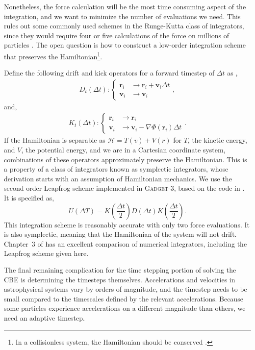 Nonetheless, the force calculation will be the most time consuming aspect of the integration, and we want to minimize the number of evaluations we need. This rules out some commonly used schemes in the Runge-Kutta class of integrators, since they would require four or five calculations of the force on millions of particles \citep{numerical_recipes_fortran}. The open question is how to construct a low-order integration scheme that preserves the Hamiltonian\footnote{In a collisionless system, the Hamiltonian should be conserved \citep{BT}.}.

Define the following drift and kick operators for a forward timestep of $\Delta t$ as \citep{quinn_1997},
\begin{eqnarray}
D_t(\Delta t) : \begin{cases} 
	  \textbf{r}_i & \longrightarrow  \textbf{r}_i + \textbf{v}_i \Delta t\\
      \textbf{v}_i & \longrightarrow  \textbf{v}_i 
   \end{cases},
\end{eqnarray}
and,
\begin{eqnarray}
K_t(\Delta t) : \begin{cases} 
	  \textbf{r}_i & \longrightarrow  \textbf{r}_i\\
      \textbf{v}_i & \longrightarrow  \textbf{v}_i  - \nabla \Phi(\textbf{r}_i) \Delta t
   \end{cases}.
\end{eqnarray}
If the Hamiltonian is separable as $\mathcal{H} = T(v) + V(r)$ for $T$, the kinetic energy, and  $V$, the potential energy, and we are in a Cartesian coordinate system, combinations of these operators approximately preserve the Hamiltonian. This is a property of a class of integrators known as symplectic integrators, whose derivation starts with an assumption of Hamiltonian mechanics. We use the second order Leapfrog scheme implemented in \textsc{Gadget-3}, based on the code in \citet{GadgetCodePaper}. It is specified as,
\begin{equation}
U(\Delta T) = K\left(\frac{\Delta t}{2}\right) D\left(\Delta t\right) K\left(\frac{\Delta t}{2}\right).
\end{equation}
This integration scheme is reasonably accurate with only two force evaluations. It is also symplectic, meaning that the Hamiltonian of the system will not drift. Chapter~3 of \citet{BT} has an excellent comparison of numerical integrators, including the Leapfrog scheme given here.

The final remaining complication for the time stepping portion of solving the CBE is determining the timesteps themselves.  Accelerations and velocities in astrophysical systems vary by orders of magnitude, and the timestep needs to be small compared to the timescales defined by the relevant accelerations. Because some particles experience accelerations on a different magnitude than others, we need an adaptive timestep.

